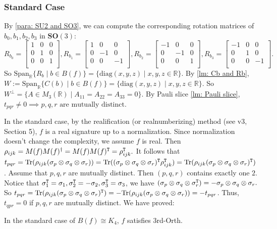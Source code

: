 \subsubsection{Standard Case}\label{subsubsec: Standard Case Klein}
By \cref{para: SU2 and SO3}, we can compute the corresponding rotation matrices of $b_0,b_1,b_2,b_3$ in $\mathbf{SO}(3)$:
$$
R_{b_0}=
\left[\begin{matrix}
    1 & 0 & 0\\
    0 & 1 & 0\\
    0 & 0 & 1\\
\end{matrix}\right],
R_{b_1}=
\left[\begin{matrix}
    1 & 0 & 0\\
    0 & -1 & 0\\
    0 & 0 & -1\\
\end{matrix}\right],
R_{b_2}=
\left[\begin{matrix}
    -1 & 0 & 0\\
    0 & -1 & 0\\
    0 & 0 & 1\\
\end{matrix}\right],
R_{b_3}=
\left[\begin{matrix}
    -1 & 0 & 0\\
    0 & 1 & 0\\
    0 & 0 & -1\\
\end{matrix}\right].
$$
So $\mathrm{Span}_{\mathbb R}\{R_{b}\mid b\in B(f)\}=\{\mathrm{diag}(x,y,z)\mid x,y,z\in \mathbb R\}.$
By \cref{lm: Cb and Rb}, $W:=\mathrm{Span}_{\mathbb R}\{C(b)\mid b\in B(f)\}=\{\mathrm{diag}(x,y,z)\mid x,y,z\in \mathbb R\}.$
So $W^\perp=\{A\in M_3(\mathbb{R})\mid A_{11}=A_{22}=A_{33}=0\}.$
By Pauli slice \cref{lm: Pauli slice}, $t_{pqr}\neq 0\implies p,q,r\text{ are mutually distinct}.$

In the standard case, by the realification (or realnumberizing) method (see \cite{MingjiProgram} v3, Section 5), $f$ is a real signature up to a normalization.
Since normalization doesn't change the complexity, we assume $f$ is real.
Then $\rho_{ijk}=M(f)M(f)^{\dagger}=M(f)M(f)^{\tt T}=\rho_{ijk}^{\tt T}.$
It follows that $t_{pqr}=\mathrm{Tr}(\rho_{ijk}(\sigma_p\otimes \sigma_q\otimes \sigma_r))=\mathrm{Tr}((\sigma_p\otimes \sigma_q\otimes \sigma_r)^{\tt T}\rho_{ijk}^{\tt T})=\mathrm{Tr}(\rho_{ijk}(\sigma_p\otimes \sigma_q\otimes \sigma_r)^{\tt T})$.
Assume that $p,q,r$ are mutually distinct. 
Then $(p,q,r)$ contains exactly one $2$.
Notice that $\sigma_1^{\tt T}=\sigma_1,\sigma_2^{\tt T}=-\sigma_2,\sigma_3^{\tt T}=\sigma_3$, we have  $(\sigma_p\otimes \sigma_q\otimes \sigma_r^{\tt T})=-\sigma_p\otimes \sigma_q\otimes \sigma_r.$
So $t_{pqr}=\mathrm{Tr}(\rho_{ijk}(\sigma_p\otimes \sigma_q\otimes \sigma_r)^{\tt T})=-\mathrm{Tr}(\rho_{ijk}(\sigma_p\otimes \sigma_q\otimes \sigma_r))=-t_{pqr}$.
Thus, $t_{qpr}=0$ if $p,q,r$ are mutually distinct.
We have proved:
\begin{lemma}\label{lm: K4 standard case}
    In the standard case of $B(f)\cong K_4$, $f$ satisfies {\sc 3rd-Orth}.
\end{lemma}


